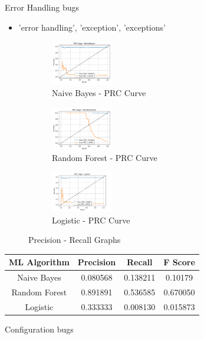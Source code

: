 \documentclass{seal_article}
\begin{document}
\vspace{0.5cm}
Error Handling bugs

\begin{itemize}
\item  'error handling', 'exception', 'exceptions'
\end{itemize}



\vspace{0.5cm}
\begin{figure}[h] 
\centering
\captionsetup{justification=centering}
\begin{subfigure}{.3\linewidth}
  \centering
  \includegraphics[width=2.7cm]{img/naive_error_handling.PNG}
  \caption{Naive Bayes - PRC Curve}
  \label{fig:sub1}
\end{subfigure}
\begin{subfigure}{.3\linewidth}
  \centering
  \includegraphics[width=2.7cm]{img/random_forest_error_handling.PNG}
  \caption{Random Forest - PRC Curve}
  \label{fig:sub1}
\end{subfigure}
\begin{subfigure}{.3\linewidth}
  \centering
  \includegraphics[width=2.7cm]{img/logistic_error_handling.PNG}
  \caption{Logistic - PRC Curve}
  \label{fig:sub2}
\end{subfigure}
\caption{Precision - Recall Graphs}
\label{fig.aug}
\end{figure} 
\begin{center}
 \begin{tabular}{||c c c c||} 
 \hline
 ML Algorithm &Precision & Recall & F Score   \\ [0.5ex] 
 \hline\hline
  Naive Bayes & 0.080568 & 0.138211 & 0.10179\\ 
 \hline
 Random Forest &  0.891891 & 0.536585 & 0.670050 \\
 \hline
 Logistic & 0.333333 & 0.008130 & 0.015873 \\
 \hline
\end{tabular}
\end{center}
\vspace{0.5cm}
Configuration bugs
\end{document}
